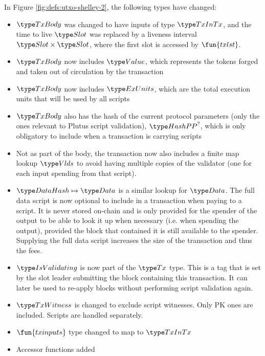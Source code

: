 In Figure \ref{fig:defs:utxo-shelley-2}, the following types have changed:

\begin{itemize}
  \item $\TxBody$ was changed to have inputs of type $\TxInTx$, and the
  time to live $\Slot$ was replaced by a liveness interval $\Slot \times \Slot$,
  where the first slot is accessed by $\fun{txlst}$.
  \item $\TxBody$ now includes $\Value$, which represents
  the tokens forged and taken out of circulation by the transaction
  \item $\TxBody$ now includes $\ExUnits$, which are the total execution units
  that will be used by all scripts
  \item $\TxBody$ also has the hash of the current protocol parameters
  (only the ones relevant to Plutus script validation), $\HashPP^?$,
  which is only obligatory to include when a transaction is carrying scripts
  \item Not as part of the body, the transaction now also includes
  a finite map lookup $\Vlds$ to avoid having multiple
  copies of the validator (one for each input spending from that script).
  \item $\HashDat \mapsto \Data$ is a similar lookup for $\Data$.
  The full data script is now optional to include in a transaction when
  paying to a script. It is never
  stored on-chain and is only provided for the spender of the output
  to be able to look it up when necessary (i.e. when spending the output),
  provided the block that contained it is still available to the spender.
  Supplying the full data script increases the size of the transaction and
  thus the fees.
  \item $\IsValidating$ is now part of the $\Tx$ type. This is a tag that is
  set by the slot leader submitting the block containing this transaction.
  It can later be used to re-apply blocks without performing script validation
  again.
  \item $\TxWitness$ is changed to exclude script witnesses. Only PK ones
  are included. Scripts are handled separately.
  \item $\fun{txinputs}$ type changed to map to $\TxInTx$
  \item Accessor functions added
\end{itemize}




